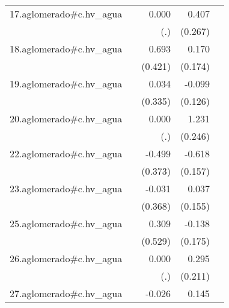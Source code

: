 {\begin{longtable}{l*{4}{D{.}{.}{-1}}}
\addlinespace
17.aglomerado#c.hv\_agua&                     &       0.000         &       0.407         &                     \\
            &                     &         (.)         &     (0.267)         &                     \\
\addlinespace
18.aglomerado#c.hv\_agua&                     &       0.693         &       0.170         &                     \\
            &                     &     (0.421)         &     (0.174)         &                     \\
\addlinespace
19.aglomerado#c.hv\_agua&                     &       0.034         &      -0.099         &                     \\
            &                     &     (0.335)         &     (0.126)         &                     \\
\addlinespace
20.aglomerado#c.hv\_agua&                     &       0.000         &       1.231\sym{***}&                     \\
            &                     &         (.)         &     (0.246)         &                     \\
\addlinespace
22.aglomerado#c.hv\_agua&                     &      -0.499         &      -0.618\sym{***}&                     \\
            &                     &     (0.373)         &     (0.157)         &                     \\
\addlinespace
23.aglomerado#c.hv\_agua&                     &      -0.031         &       0.037         &                     \\
            &                     &     (0.368)         &     (0.155)         &                     \\
\addlinespace
25.aglomerado#c.hv\_agua&                     &       0.309         &      -0.138         &                     \\
            &                     &     (0.529)         &     (0.175)         &                     \\
\addlinespace
26.aglomerado#c.hv\_agua&                     &       0.000         &       0.295         &                     \\
            &                     &         (.)         &     (0.211)         &                     \\
\addlinespace
27.aglomerado#c.hv\_agua&                     &      -0.026         &       0.145         &                     \\

\end{longtable}}
